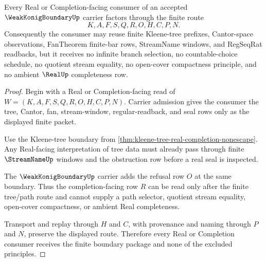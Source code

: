 \begin{theorem}
\label{thm:weak-konig-boundary-real-completion-refusal}
Every Real or Completion-facing consumer of an accepted $\WeakKonigBoundaryUp$ carrier factors through the finite route
$$
K,A,F,S,Q,R,O,H,C,P,N .
$$
Consequently the consumer may reuse finite Kleene-tree prefixes, Cantor-space observations, FanTheorem finite-bar rows, StreamName windows, and RegSeqRat readbacks, but it receives no infinite branch selection, no countable-choice schedule, no quotient stream equality, no open-cover compactness principle, and no ambient $\RealUp$ completeness row.
\end{theorem}
\begin{proof}
Begin with a Real or Completion-facing read of $W=(K,A,F,S,Q,R,O,H,C,P,N)$. Carrier admission gives the consumer the tree, Cantor, fan, stream-window, regular-readback, and seal rows only as the displayed finite packet.

Use the Kleene-tree boundary from \autoref{thm:kleene-tree-real-completion-nonescape}. Any Real-facing interpretation of tree data must already pass through finite $\StreamNameUp$ windows and the obstruction row before a real seal is inspected.

The $\WeakKonigBoundaryUp$ carrier adds the refusal row $O$ at the same boundary. Thus the completion-facing row $R$ can be read only after the finite tree/path route and cannot supply a path selector, quotient stream equality, open-cover compactness, or ambient Real completeness.

Transport and replay through $H$ and $C$, with provenance and naming through $P$ and $N$, preserve the displayed route. Therefore every Real or Completion consumer receives the finite boundary package and none of the excluded principles.
\end{proof}



